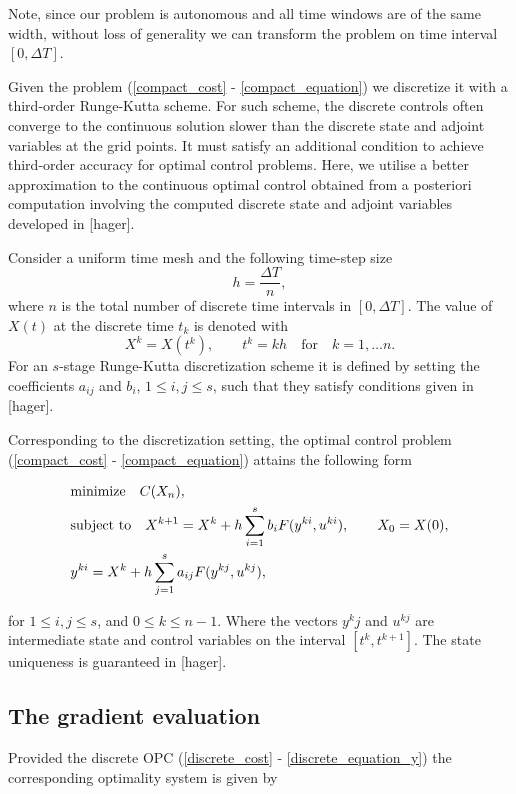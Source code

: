 \documentclass[a4paper,10pt, english]{article}
\newcommand{\D}{\displaystyle}
\begin{document}
  Note, since our problem is autonomous and all time windows are of the same width, without loss of generality
 we can transform the problem on time interval $[0, \Delta T]$. 
 
 
  
  Given the problem (\ref{compact_cost} - \ref{compact_equation}) we discretize it with a third-order Runge-Kutta scheme.  For such scheme, the discrete controls often converge to the continuous solution slower than the discrete state and adjoint variables at the grid points. It  must satisfy an additional condition to achieve third-order accuracy
    for optimal control problems. Here, we utilise a better approximation to the continuous optimal control obtained from a posteriori computation involving the computed discrete state and adjoint variables  developed in [hager]. 
    
  Consider a uniform time mesh and the following time-step size
 \begin{equation}
   h = \frac{\Delta T}{n},
   \label{h}
 \end{equation}
 where $n$ is the total number of discrete time intervals in $[0, \Delta T]$.  The value of $X(t)$ at the discrete time $t_k$ is denoted with
 $$
 X^k = X(t^k), \qquad t^k = kh \quad\mbox{for} \quad k = 1, \dots n.
 $$
 For an $s$-stage Runge-Kutta discretization scheme it is defined by setting the coefficients $a_{ij}$ and
 $b_{i}$, $1\leq i, j\leq s$, such that they satisfy conditions given in [hager]. 
 
 Corresponding to the discretization setting, the optimal control problem (\ref{compact_cost} -  \ref{compact_equation})  attains the following form
 
 \begin{align}
  \D
  & \mbox{minimize}\quad C(X_n), \label{discrete_cost}\\
  & \mbox{subject to} \quad X^{k+1}  = X^k + h\sum_{i=1}^{s}b_iF(y^{ki}, u^{ki}), \qquad X_0 = X(0), \label{discrete_equation_x}\\
  & y^{ki} = X^k + h\sum_{j=1}^{s}a_{ij}F(y^{kj}, u^{kj}),\label{discrete_equation_y}
  \end{align}
 
 for $1\leq i, j\leq s$, and $0\leq k\leq n-1$.
 Where the vectors $y^kj$ and $u^{kj}$ are intermediate state and control variables on the interval $[t^k, t^{k+1}]$. The state uniqueness is guaranteed in [hager]. 
 
 
 

\newpage
\subsection{The gradient evaluation}
Provided the discrete OPC (\ref{discrete_cost} - \ref{discrete_equation_y}) the corresponding  optimality system  is given by
\end{document}
